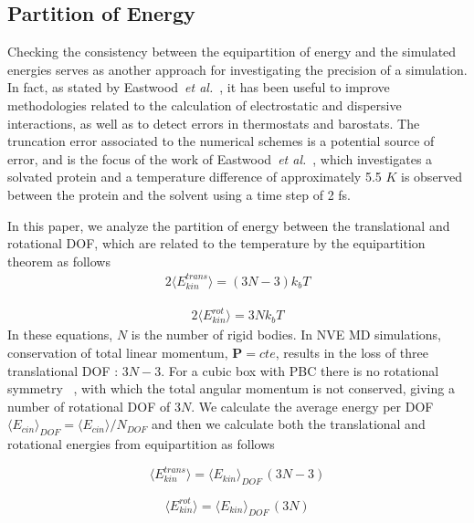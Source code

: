 \documentclass[aip,jcp,reprint,amsmath,amssymb]{revtex4-1}
\begin{document}
\subsection{Partition of Energy}
\label{sec:energypartition}

Checking the consistency between the equipartition of energy and the simulated energies serves as another approach for investigating the precision of a simulation. In fact, as stated by Eastwood~\textit{et al.}~\cite{Eastwood_2010}, it has been useful to improve methodologies related to the calculation of electrostatic\cite{Levitt_1988,Guenot_1992,Arnold_1994} and dispersive\cite{Sagui_1999} interactions, as well as to detect errors in thermostats\cite{Harvey_1998,Mor_2008} and barostats\cite{Feller_1995}. The truncation error associated to the numerical schemes is a potential source of error, and is the focus of the work of Eastwood~\textit{et al.}~\cite{Eastwood_2010}, which investigates a solvated protein and a temperature difference of approximately 5.5 $K$ is observed between the protein and the solvent using a time step of 2 fs.

In this paper, we analyze the partition of energy between the translational and rotational DOF, which are related to the temperature by the equipartition theorem as follows
\begin{align}
\label{eq:tras_equipartition}
2 \langle E_{kin}^{trans} \rangle = (3N - 3) k_b T
\end{align}

\begin{align}
\label{eq:rot_equipartition}
2 \langle E_{kin}^{rot} \rangle = 3N k_b T
\end{align} 
In these equations, $N$ is the number of rigid bodies. In NVE MD simulations, conservation of total linear momentum, $ \boldsymbol{P}= cte $, results in the loss of three translational DOF : $ 3N-3 $. For a cubic box with PBC there is no rotational symmetry ~\cite{Frenkel_2013,Kuzkin_2014}, with which the total angular momentum is not conserved, giving a number of rotational DOF of $3N$.  We calculate the average energy per DOF $ \langle E_{cin} \rangle_{DOF} = \langle E_{cin} \rangle /N_{DOF}$ and then we calculate both the translational and rotational energies from equipartition as follows

\begin{equation}
\langle E_{kin}^{trans}\rangle =  \langle E_{kin} \rangle_{DOF} \, (3N-3)
\end{equation}

\begin{equation}
\langle E_{kin}^{rot} \rangle =  \langle E_{kin} \rangle_{DOF} \, (3N)
\end{equation}
\end{document}
